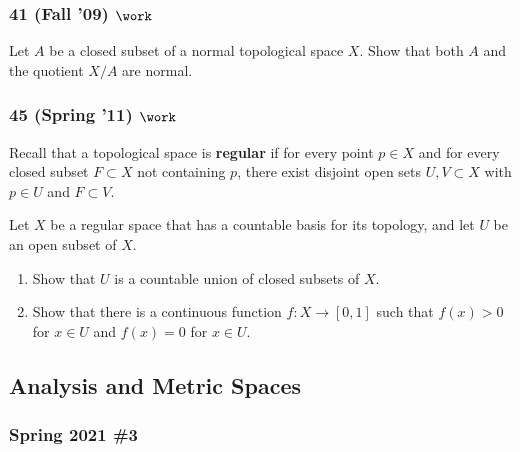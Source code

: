 \hypertarget{fall-09-work}{%
\subsubsection{\texorpdfstring{41 (Fall '09)
\(\work\)}{41 (Fall '09) \textbackslash work}}\label{fall-09-work}}

\begin{problem}[?]

Let \(A\) be a closed subset of a normal topological space \(X\). Show
that both \(A\) and the quotient \(X/A\) are normal.

\end{problem}

\hypertarget{spring-11-work-1}{%
\subsubsection{\texorpdfstring{45 (Spring '11)
\(\work\)}{45 (Spring '11) \textbackslash work}}\label{spring-11-work-1}}

\begin{problem}[?]

Recall that a topological space is \textbf{regular} if for every point
\(p \in X\) and for every closed subset \(F \subset X\) not containing
\(p\), there exist disjoint open sets \(U, V \subset X\) with
\(p \in U\) and \(F \subset V\).

Let \(X\) be a regular space that has a countable basis for its
topology, and let \(U\) be an open subset of \(X\).

\begin{enumerate}
\def\labelenumi{\alph{enumi}.}
\item
  Show that \(U\) is a countable union of closed subsets of \(X\).
\item
  Show that there is a continuous function \(f : X \to [0,1]\) such that
  \(f (x) > 0\) for \(x \in U\) and \(f (x) = 0\) for \(x \in U\).
\end{enumerate}

\end{problem}

\hypertarget{analysis-and-metric-spaces}{%
\subsection{Analysis and Metric
Spaces}\label{analysis-and-metric-spaces}}

\hypertarget{spring-2021-3}{%
\subsubsection{Spring 2021 \#3}\label{spring-2021-3}}


